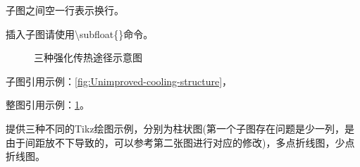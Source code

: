子图之间空一行表示换行。

插入子图请使用\textbackslash subfloat\{\}命令。

\begin{figure}[htb]

    \caption{三种强化传热途径示意图}
    \label{fig:Three-enhanced-heat-transfer-paths}
\end{figure}

子图引用示例：\cref{fig:Unimproved-cooling-structure}，

整图引用示例：\cref{fig:Three-enhanced-heat-transfer-paths}。

提供三种不同的Tikz绘图示例，分别为柱状图(第一个子图存在问题是少一列，是由于间距放不下导致的，可以参考第二张图进行对应的修改)，多点折线图，少点折线图。

